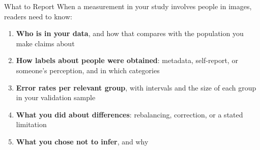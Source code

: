 \begin{frame}{What to Report}
When a measurement in your study involves people in images, readers need to know:

\vspace{0.2cm}
\begin{enumerate}
\setlength{\itemsep}{4pt}
\item \textbf{Who is in your data}, and how that compares with the population you make claims
      about
\item \textbf{How labels about people were obtained}: metadata, self-report, or someone's
      perception, and in which categories
\item \textbf{Error rates per relevant group}, with intervals and the size of each group in your
      validation sample
\item \textbf{What you did about differences}: rebalancing, correction, or a stated limitation
\item \textbf{What you chose not to infer}, and why
\end{enumerate}
\end{frame}



